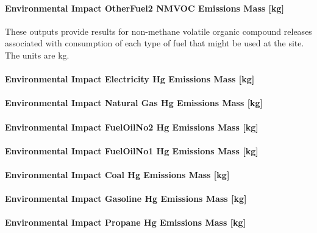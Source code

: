 \paragraph{Environmental Impact OtherFuel2 NMVOC Emissions Mass {[}kg{]}}\label{environmental-impact-otherfuel2-nmvoc-emissions-mass-kg}

These outputs provide results for non-methane volatile organic compound releases associated with consumption of each type of fuel that might be used at the site.~ The units are kg.

\paragraph{Environmental Impact Electricity Hg Emissions Mass {[}kg{]}}\label{environmental-impact-electricity-hg-emissions-mass-kg}

\paragraph{Environmental Impact Natural Gas Hg Emissions Mass {[}kg{]}}\label{environmental-impact-natural-gas-hg-emissions-mass-kg}

\paragraph{Environmental Impact FuelOilNo2 Hg Emissions Mass {[}kg{]}}\label{environmental-impact-fuel-oil-2-hg-emissions-mass-kg}

\paragraph{Environmental Impact FuelOilNo1 Hg Emissions Mass {[}kg{]}}\label{environmental-impact-fuel-oil-1-hg-emissions-mass-kg}

\paragraph{Environmental Impact Coal Hg Emissions Mass {[}kg{]}}\label{environmental-impact-coal-hg-emissions-mass-kg}

\paragraph{Environmental Impact Gasoline Hg Emissions Mass {[}kg{]}}\label{environmental-impact-gasoline-hg-emissions-mass-kg}

\paragraph{Environmental Impact Propane Hg Emissions Mass {[}kg{]}}\label{environmental-impact-propane-hg-emissions-mass-kg}

